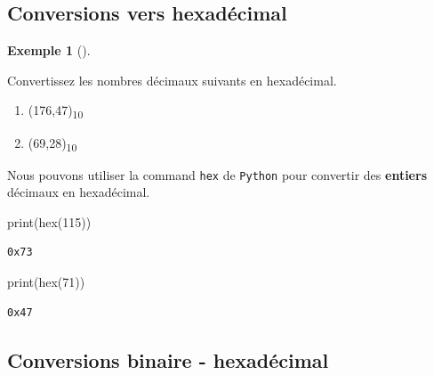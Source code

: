 \documentclass[
  letterpaper,
]{scrbook}
\newenvironment{Shaded}{}{}
\newcommand{\BuiltInTok}[1]{#1}
\newcommand{\DecValTok}[1]{\textcolor[rgb]{0.25,0.63,0.44}{#1}}
\newcommand{\NormalTok}[1]{#1}
\providecommand{\tightlist}{%
  \setlength{\itemsep}{0pt}\setlength{\parskip}{0pt}}\usepackage{longtable,booktabs,array}
\theoremstyle{plain}
\theoremstyle{definition}
\newtheorem{example}{Exemple}[chapter]
\theoremstyle{definition}
\theoremstyle{remark}
\begin{document}
\hypertarget{conversions-vers-hexaduxe9cimal}{%
\subsection{Conversions vers
hexadécimal}\label{conversions-vers-hexaduxe9cimal}}

\leavevmode{}%
\begin{example}[]\label{exm-conversion-decimal-hexadecimal}

Convertissez les nombres décimaux suivants en hexadécimal.

\begin{enumerate}
\def\labelenumi{\alph{enumi})}
\tightlist
\item
  (176,47)\textsubscript{10}
\item
  (69,28)\textsubscript{10}
\end{enumerate}

\end{example}

Nous pouvons utiliser la command \texttt{hex} de \texttt{Python} pour
convertir des \textbf{entiers} décimaux en hexadécimal.

\begin{Shaded}
\begin{Highlighting}[]
\BuiltInTok{print}\NormalTok{(}\BuiltInTok{hex}\NormalTok{(}\DecValTok{115}\NormalTok{))}
\end{Highlighting}
\end{Shaded}

\begin{verbatim}
0x73
\end{verbatim}

\begin{Shaded}
\begin{Highlighting}[]
\BuiltInTok{print}\NormalTok{(}\BuiltInTok{hex}\NormalTok{(}\DecValTok{71}\NormalTok{))}
\end{Highlighting}
\end{Shaded}

\begin{verbatim}
0x47
\end{verbatim}

\hypertarget{conversions-binaire---hexaduxe9cimal}{%
\subsection{Conversions binaire -
hexadécimal}\label{conversions-binaire---hexaduxe9cimal}}
\end{document}
